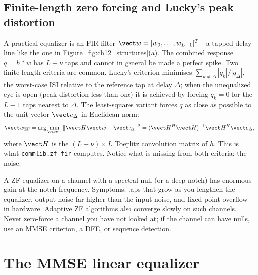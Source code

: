 \subsection{Finite-length zero forcing and Lucky's peak distortion}

A practical equalizer is an FIR filter $\vect w=[w_0,\dots,w_{L-1}]^T$---a tapped delay line like
the one in Figure~\ref{fig:ch12_structures}(a). The combined response $q=h*w$ has $L+\nu$ taps and
cannot in general be made a perfect spike. Two finite-length criteria are common. Lucky's
 criterion minimises $\sum_{k\ne\Delta}|q_k|/|q_\Delta|$, the worst-case ISI
relative to the reference tap at delay $\Delta$; when the unequalized eye is open (peak distortion
less than one) it is achieved by forcing $q_k=0$ for the $L-1$ taps nearest to $\Delta$. The
least-squares variant forces $q$ as close as possible to the unit vector $\vect e_\Delta$ in
Euclidean norm:
\begin{equation}
\vect w_{\mathrm{ZF}}=\arg\min_{\vect w}\|\vect H\vect w-\vect e_\Delta\|^2=
(\vect H^H\vect H)^{-1}\vect H^H\vect e_\Delta,
\label{eq:ch12:zffir}
\end{equation}
where $\vect H$ is the $(L+\nu)\times L$ Toeplitz convolution matrix of $h$. This is what
\texttt{commlib.zf\_fir} computes. Notice what is missing from both criteria: the noise.


\begin{pitfall}
A ZF equalizer on a channel with a spectral null (or a deep notch) has enormous gain at the notch
frequency. Symptoms: taps that grow as you lengthen the equalizer, output noise far higher than the
input noise, and fixed-point overflow in hardware. Adaptive ZF algorithms also converge slowly on such
channels. Never zero-force a channel you have not looked at; if the channel can have nulls, use an
MMSE criterion, a DFE, or sequence detection.
\end{pitfall}

\section{The MMSE linear equalizer}
\label{sec:ch12:mmse}

